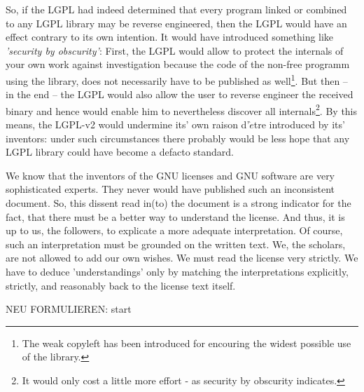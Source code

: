So, if the LGPL had indeed determined that every program linked or combined to
any LGPL library may be reverse engineered, then the LGPL would have an effect
contrary to its own intention. It would have introduced something like
\emph{'security by obscurity'}: First, the LGPL would allow to protect the
internals of your own work against investigation because the code of the
non-free programm using the library, does not necessarily have to be published
as well\footnote{The weak copyleft has been introduced for encouring the widest
possible use of the library.}. But then -- in the end -- the LGPL would also
allow the user to reverse engineer the received binary and hence would enable
him to nevertheless discover all internals\footnote{It would only cost a little
more effort - as security by obscurity indicates.}. By this means, the LGPL-v2
would undermine its' own raison d'$\grave{e}$tre introduced by its' inventors:
under such circumstances there probably would be less hope that any LGPL library
could have become a defacto standard.

We know that the inventors of the GNU licenses and GNU software are very
sophisticated experts. They never would have published such an inconsistent
document. So, this dissent read in(to) the document is a strong indicator for
the fact, that there must be a better way to understand the license. And thus,
it is up to us, the followers, to explicate a more adequate interpretation. Of
course, such an interpretation must be grounded on the written text. We, the
scholars, are not allowed to add our own wishes. We must read the license very
strictly. We have to deduce 'understandings' only by matching the
interpretations explicitly, strictly, and reasonably back to the license text
itself.


NEU FORMULIEREN: start

